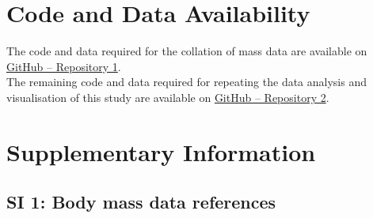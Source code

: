 \documentclass[11pt]{article}
\begin{document}
\pagebreak

\section*{Code and Data Availability}
The code and data required for the collation of mass data are available on \href{https://github.com/icgk523/InsectMasses.git}{GitHub -- Repository 1}. \\
The remaining code and data required for repeating the data analysis and visualisation of this study are available on \href{https://github.com/icgk523/CMEE_Project.git}{GitHub -- Repository 2}.
\pagebreak

\begingroup

\endgroup



\pagebreak
\nolinenumbers

\section*{Supplementary Information}
\vspace{-0.25cm}

\subsection*{SI 1: Body mass data references}
\end{document}
